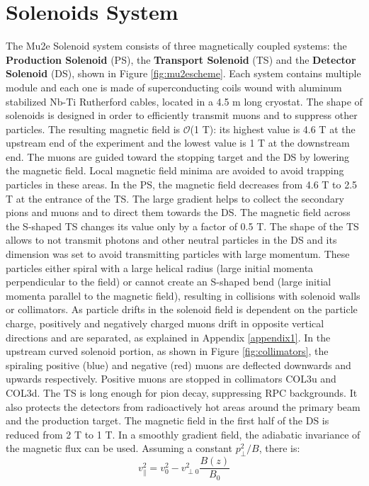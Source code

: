 \section{Solenoids System}
The Mu2e Solenoid system consists of three magnetically coupled systems: the \textbf{Production Solenoid} (PS), the \textbf{Transport Solenoid} (TS) and the \textbf{Detector Solenoid} (DS), shown in Figure \ref{fig:mu2escheme}. Each system contains multiple module and each one is made of superconducting coils wound with aluminum stabilized Nb-Ti Rutherford cables, located in a 4.5 m long cryostat. The shape of solenoids is designed in order to efficiently transmit muons and to suppress other particles. The resulting magnetic field is $\mathcal{O}$(1 T): its highest value is 4.6 T at the upstream end of the experiment and the lowest value is 1 T at the downstream end. The muons are guided toward the stopping target and the DS by lowering the magnetic field. Local magnetic field minima are avoided to avoid trapping particles in these areas. In the PS, the magnetic field decreases from 4.6 T to 2.5 T at the entrance of the TS. The large gradient helps to collect the secondary pions and muons and to direct them towards the DS. The magnetic field across the S-shaped TS changes its value only by a factor of 0.5 T. The shape of the TS allows to not transmit photons and other neutral particles in the DS and its dimension was set to avoid transmitting particles with large momentum. These particles either spiral with a large helical radius (large initial momenta perpendicular to the field) or cannot create an S-shaped bend (large initial momenta parallel to the magnetic field), resulting in collisions with solenoid walls or collimators. As particle drifts in the solenoid field is dependent on the particle charge, positively and negatively charged muons drift in opposite vertical directions and are separated, as explained in Appendix \ref{appendix1}. In the upstream curved solenoid portion, as shown in Figure \ref{fig:collimators}, the spiraling positive (blue) and negative (red) muons are deflected downwards and upwards respectively. Positive muons are stopped in collimators COL3u and COL3d. The TS is long enough for pion decay, suppressing RPC backgrounds. It also protects the detectors from radioactively hot areas around the primary beam and the production target. The magnetic field in the first half of the DS is reduced from 2 T to 1 T. In a smoothly gradient field, the adiabatic invariance of the magnetic flux can be used. Assuming a constant $p^2_\perp/B$, there is:
\begin{equation}
    v^2_{\parallel}=v^2_0-v^2_{\perp 0}\frac{B(z)}{B_0}
\end{equation}
